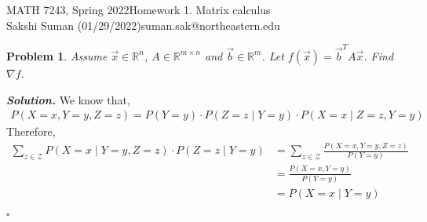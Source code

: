 \documentclass[11pt]{amsart}
\newtheorem{problem}{Problem}
\newenvironment{solution}[1][\it{Solution}]{\textbf{#1. } }{$\square$}
\theoremstyle{definition}
\newcommand{\R}{\mathbb{R}}
\newcommand{\vb}{\vec{b}}
\newcommand{\vx}{\vec{x}}
\begin{document}
\noindent MATH 7243, Spring 2022\hfill Homework 1.  Matrix calculus\\
Sakshi Suman (01/29/2022)\hfill suman.sak@northeastern.edu

\hrulefill


\begin{problem}
Assume $\vx\in \R^n$,  $A\in \R^{m\times n}$ and $\vb\in \R^m$. Let $f(\vx)=\vb^T A \vx$. Find  $\nabla f$. 
\end{problem}
\begin{solution}
We know that,
\begin{align*}
P(X=x, Y=y, Z=z)=P(Y=y) \cdot P(Z=z \mid Y=y) \cdot P(X=x \mid Z=z, Y=y)
\end{align*}
Therefore,
\begin{align*}
\sum_{z \in \mathcal{Z}} P(X=x \mid Y=y, Z=z) \cdot P(Z=z \mid Y=y) & = \sum_{z \in \mathcal{Z}} \frac{P(X=x, Y=y, Z=z)}{P(Y=y)}\\
													& = \frac{P(X=x, Y=y)}{P(Y=y)} \\
													& = P(X=x \mid Y=y)
\end{align*}

\end{solution} 
\end{document}
